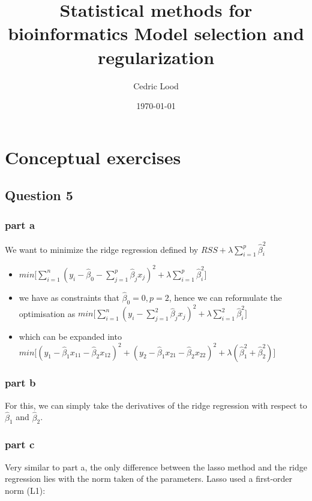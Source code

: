 \documentclass[11pt, a4paper]{article}
\title{Statistical methods for bioinformatics \linebreak Model selection and regularization}
\author{Cedric Lood}
\date{\today}
\begin{document}
\maketitle


\graphicspath{ {figures/} }
\setlength{\droptitle}{-5em} 
\setlength{\parindent}{0cm}

\section{Conceptual exercises}
\label{sec-1}
\subsection{Question 5}
\label{sec-1-1}
\subsubsection{part a}
\label{sec-1-1-1}

We want to minimize the ridge regression defined by $RSS + \lambda \sum\limits_{i=1}^p \hat{\beta}_i^2$

\begin{itemize}
\item $min\Big[\sum\limits_{i=1}^n {(y_i - \hat{\beta}_0 - \sum\limits_{j=1}^p {\hat{\beta}_jx_j} )^2} + \lambda \sum\limits_{i=1}^p \hat{\beta}_i^2\Big]$
\item we have as constraints that $\hat{\beta}_0 = 0, p=2$, hence we can
  reformulate the optimisation as $min\Big[\sum\limits_{i=1}^n {(y_i - \sum\limits_{j=1}^2 {\hat{\beta}_jx_j} )^2} + \lambda \sum\limits_{i=1}^2 \hat{\beta}_i^2\Big]$
\item which can be expanded into $min\Big[ (y_1 - \hat{\beta}_1x_{11} - \hat{\beta}_2x_{12})^2 + (y_2 - \hat{\beta}_1x_{21} - \hat{\beta}_2x_{22})^2 + \lambda (\hat{\beta}_1^2 + \hat{\beta}_2^2)\Big]$
\end{itemize}
\subsubsection{part b}
\label{sec-1-1-2}

For this, we can simply take the derivatives of the ridge regression
with respect to $\hat{\beta}_1$ and $\hat{\beta}_2$.
\subsubsection{part c}
\label{sec-1-1-3}

Very similar to part a, the only difference between the lasso method
and the ridge regression lies with the norm taken of the
parameters. Lasso used a first-order norm (L1):
\end{document}

